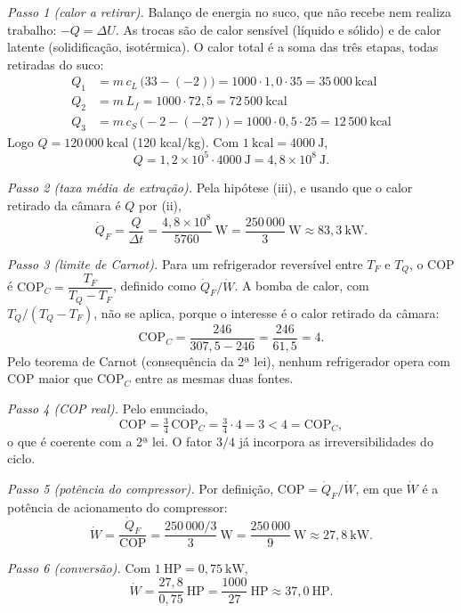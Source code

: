 \documentclass{article}%
\begin{document}
\textit{Passo 1 (calor a retirar).} Balanço de energia no suco, que não recebe nem realiza trabalho: $-Q = \Delta U$. As trocas são de calor sensível (líquido e sólido) e de calor latente (solidificação, isotérmica). O calor total é a soma das três etapas, todas retiradas do suco:
\begin{align*}
Q_1 &= m\,c_L\,\bigl(33-(-2)\bigr) = 1000\cdot 1{,}0\cdot 35 = 35\,000\ \text{kcal}\\
Q_2 &= m\,L_f = 1000\cdot 72{,}5 = 72\,500\ \text{kcal}\\
Q_3 &= m\,c_S\,\bigl(-2-(-27)\bigr) = 1000\cdot 0{,}5\cdot 25 = 12\,500\ \text{kcal}
\end{align*}
Logo $Q = 120\,000\ \text{kcal}$ (120 kcal/kg). Com $1\ \text{kcal} = 4000\ \text{J}$,
\[
Q = 1{,}2\times10^{5}\cdot 4000\ \text{J} = 4{,}8\times10^{8}\ \text{J}.
\]

\textit{Passo 2 (taxa média de extração).} Pela hipótese (iii), e usando que o calor retirado da câmara é $Q$ por (ii),
\[
\dot Q_F = \frac{Q}{\Delta t} = \frac{4{,}8\times10^{8}}{5760}\ \text{W} = \frac{250\,000}{3}\ \text{W} \approx 83{,}3\ \text{kW}.
\]

\textit{Passo 3 (limite de Carnot).} Para um refrigerador reversível entre $T_F$ e $T_Q$, o COP é $\text{COP}_C = \dfrac{T_F}{T_Q-T_F}$, definido como $\dot Q_F/\dot W$. A bomba de calor, com $T_Q/(T_Q-T_F)$, não se aplica, porque o interesse é o calor retirado da câmara:
\[
\text{COP}_C = \frac{246}{307{,}5-246} = \frac{246}{61{,}5} = 4.
\]
Pelo teorema de Carnot (consequência da 2ª lei), nenhum refrigerador opera com COP maior que $\text{COP}_C$ entre as mesmas duas fontes.

\textit{Passo 4 (COP real).} Pelo enunciado,
\[
\text{COP} = \tfrac{3}{4}\,\text{COP}_C = \tfrac{3}{4}\cdot 4 = 3 < 4 = \text{COP}_C,
\]
o que é coerente com a 2ª lei. O fator $3/4$ já incorpora as irreversibilidades do ciclo.

\textit{Passo 5 (potência do compressor).} Por definição, $\text{COP} = \dot Q_F/\dot W$, em que $\dot W$ é a potência de acionamento do compressor:
\[
\dot W = \frac{\dot Q_F}{\text{COP}} = \frac{250\,000/3}{3}\ \text{W} = \frac{250\,000}{9}\ \text{W} \approx 27{,}8\ \text{kW}.
\]

\textit{Passo 6 (conversão).} Com $1\ \text{HP} = 0{,}75\ \text{kW}$,
\[
\dot W = \frac{27{,}8}{0{,}75}\ \text{HP} = \frac{1000}{27}\ \text{HP} \approx 37{,}0\ \text{HP}.
\]
\end{document}
